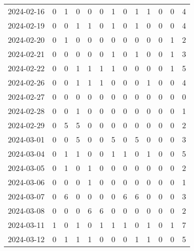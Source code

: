 \documentclass[dvipdfmx,oneside]{article}
\begin{document}
\begin{longtable}{lcccccccccccc}
        2024-02-16 &     0 &     1 &     0 &     0 &     0 &     1 &     0 &     1 &     1 &     0 &     0 &      4 \\
        2024-02-19 &     0 &     0 &     1 &     1 &     0 &     1 &     0 &     1 &     0 &     0 &     0 &      4 \\
        2024-02-20 &     0 &     1 &     0 &     0 &     0 &     0 &     0 &     0 &     0 &     0 &     1 &      2 \\
        2024-02-21 &     0 &     0 &     0 &     0 &     0 &     1 &     0 &     1 &     0 &     0 &     1 &      3 \\
        2024-02-22 &     0 &     0 &     1 &     1 &     1 &     1 &     0 &     0 &     0 &     0 &     1 &      5 \\
        2024-02-26 &     0 &     0 &     1 &     1 &     1 &     0 &     0 &     0 &     1 &     0 &     0 &      4 \\
        2024-02-27 &     0 &     0 &     0 &     0 &     0 &     0 &     0 &     0 &     0 &     0 &     0 &      0 \\
        2024-02-28 &     0 &     0 &     1 &     0 &     0 &     0 &     0 &     0 &     0 &     0 &     0 &      1 \\
        2024-02-29 &     0 &     5 &     5 &     0 &     0 &     0 &     0 &     0 &     0 &     0 &     0 &      2 \\
        2024-03-01 &     0 &     0 &     5 &     0 &     0 &     5 &     0 &     5 &     0 &     0 &     0 &      3 \\
        2024-03-04 &     0 &     1 &     1 &     0 &     0 &     1 &     1 &     0 &     1 &     0 &     0 &      5 \\
        2024-03-05 &     0 &     1 &     0 &     1 &     0 &     0 &     0 &     0 &     0 &     0 &     0 &      2 \\
        2024-03-06 &     0 &     0 &     0 &     1 &     0 &     0 &     0 &     0 &     0 &     0 &     0 &      1 \\
        2024-03-07 &     0 &     6 &     0 &     0 &     0 &     0 &     6 &     6 &     0 &     0 &     0 &      3 \\
        2024-03-08 &     0 &     0 &     0 &     6 &     6 &     0 &     0 &     0 &     0 &     0 &     0 &      2 \\
        2024-03-11 &     1 &     0 &     1 &     0 &     1 &     1 &     1 &     0 &     1 &     0 &     1 &      7 \\
        2024-03-12 &     0 &     1 &     1 &     1 &     0 &     0 &     0 &     1 &     1 &     0 &     0 &      5 \\

\end{longtable}
\end{document}
